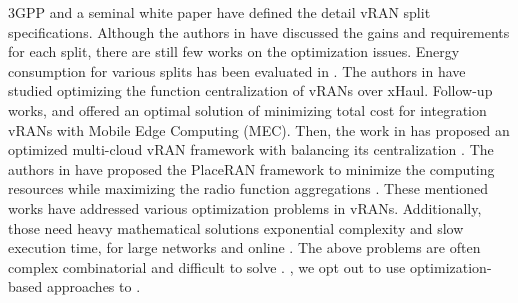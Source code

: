  3GPP \cite{split_3gpp,split_3gpp_rel16} and a seminal white paper \cite{smallcell} have defined the detail vRAN split specifications. Although the authors in  \cite{function_split_survey} have discussed the gains and requirements for each split, there are still few works on the optimization issues. Energy consumption for various splits has been evaluated in \cite{apt-ran}.
The authors in \cite{wizhaul_andres} have studied optimizing the function centralization of vRANs over xHaul. Follow-up works, \cite{fluidran_andres} and \cite{vranmec_andres} offered an optimal solution of minimizing total cost for integration vRANs with Mobile Edge Computing (MEC). Then, the work in \cite{vran_murti1} has proposed an optimized multi-cloud vRAN framework with balancing its centralization \cite{vran_murti2}. The authors in \cite{placeran} have proposed the PlaceRAN framework to minimize the computing resources while maximizing the radio function aggregations . These mentioned works \cite{apt-ran,wizhaul_andres,fluidran_andres,vranmec_andres,vran_murti1,vran_murti2,placeran} have addressed various optimization problems in vRANs.  Additionally, those  need heavy mathematical solutions  exponential complexity and slow execution time,  for large networks and online . The above problems are  often complex combinatorial and difficult to solve . , we opt out to use optimization-based approaches to .



